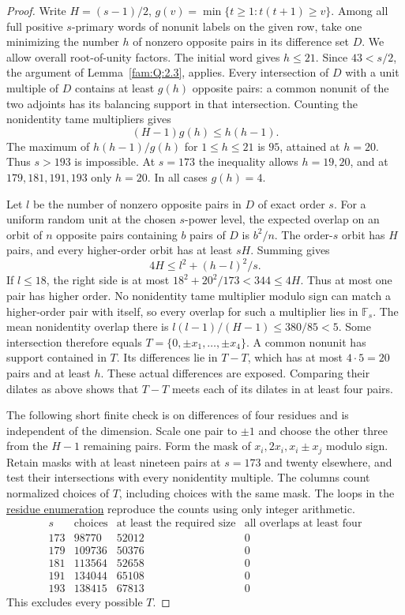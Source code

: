 \documentclass[11pt,a4paper]{article}
\numberwithin{equation}{section}
\theoremstyle{remark}
\begin{document}
\begin{proof}
Write $H=(s-1)/2$, $g(v)=\min\{t\ge1:t(t+1)\ge v\}$.
Among all full positive $s$-primary words of nonunit labels on the
given row, take one minimizing the number $h$ of nonzero opposite pairs
in its difference set $D$. We allow overall root-of-unity factors.
The initial word gives $h\le21$. Since $43<s/2$, the argument of Lemma~\ref{fam:Q:2.3}, applies. Every intersection of $D$ with a unit multiple of
$D$ contains at least $g(h)$ opposite pairs: a common nonunit of the two
adjoints has its balancing support in that intersection. Counting the
nonidentity tame multipliers gives
\[
 (H-1)g(h)\le h(h-1).
\]
The maximum of $h(h-1)/g(h)$ for $1\le h\le21$ is $95$, attained
at $h=20$. Thus $s>193$ is impossible. At $s=173$ the inequality
allows $h=19,20$, and at $179,181,191,193$ only $h=20$. In all cases
$g(h)=4$.

Let $l$ be the number of nonzero opposite pairs in $D$ of exact
order $s$. For a uniform random unit at the chosen $s$-power level,
the expected overlap on an orbit of $n$ opposite pairs containing
$b$ pairs of $D$ is $b^2/n$. The order-$s$ orbit has $H$ pairs,
and every higher-order orbit has at least $sH$. Summing gives
\[
 4H\le l^2+(h-l)^2/s .
\]
If $l\le18$, the right side is at most $18^2+20^2/173<344\le4H$.
Thus at most one pair has higher order. No nonidentity tame multiplier
modulo sign can match a higher-order pair with itself, so every overlap
for such a multiplier lies in $\mathbb F_s$. The mean nonidentity
overlap there is $l(l-1)/(H-1)\le380/85<5$. Some intersection
therefore equals $T=\{0,\pm x_1,\ldots,\pm x_4\}$.
A common nonunit has support contained in $T$. Its differences lie
in $T-T$, which has at most $4\cdot5=20$ pairs and at least $h$.
These actual differences are exposed. Comparing their dilates as
above shows that $T-T$ meets each of its dilates in at least four pairs.

The following short finite check is on differences of four residues
and is independent of the dimension. Scale one pair to $\pm1$ and
choose the other three from the $H-1$ remaining pairs. Form the mask
of $x_i,2x_i,x_i\pm x_j$ modulo sign. Retain masks with at least
nineteen pairs at $s=173$ and twenty elsewhere, and test their intersections with every nonidentity
multiple. The columns count normalized choices of $T$, including
choices with the same mask. The loops in
the \href{https://github.com/sebastienpalcoux/WGT-fusion-categories/blob/f7f9f9a02f3116e61eb9dca4eebfed77001494e8/code/short_words.py}{residue enumeration} reproduce the counts using only integer arithmetic.
\[
\begin{array}{r|rrr}
s&\text{choices}&\text{at least the required size}&\text{all overlaps at least four}\\\hline
173&98770&52012&0\\
179&109736&50376&0\\
181&113564&52658&0\\
191&134044&65108&0\\
193&138415&67813&0
\end{array}
\]
This excludes every possible $T$.
\end{proof}
\end{document}

